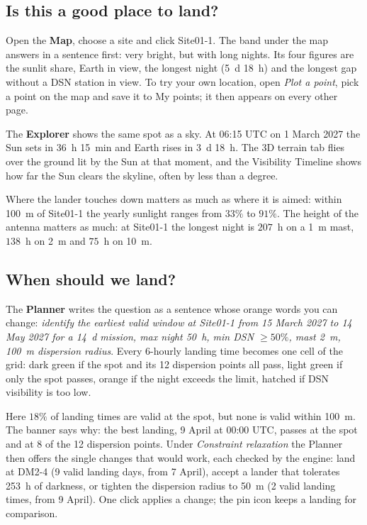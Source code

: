 \subsection{Is this a good place to land?}
Open the \textbf{Map}, choose a site and click Site01-1. The band under the map answers in a sentence first: very bright, but with long nights. Its four figures are the sunlit share, Earth in view, the longest night (5~d 18~h) and the longest gap without a DSN station in view. To try your own location, open \emph{Plot a point}, pick a point on the map and save it to My points; it then appears on every other page.

The \textbf{Explorer} shows the same spot as a sky. At 06:15 UTC on 1 March 2027 the Sun sets in 36~h 15~min and Earth rises in 3~d 18~h. The 3D terrain tab flies over the ground lit by the Sun at that moment, and the Visibility Timeline shows how far the Sun clears the skyline, often by less than a degree.


Where the lander touches down matters as much as where it is aimed: within 100~m of Site01-1 the yearly sunlight ranges from $33\%$ to $91\%$. The height of the antenna matters as much: at Site01-1 the longest night is $207$~h on a 1~m mast, $138$~h on 2~m and $75$~h on 10~m.

\subsection{When should we land?}
The \textbf{Planner} writes the question as a sentence whose orange words you can change: \emph{identify the earliest valid window at Site01-1 from 15 March 2027 to 14 May 2027 for a 14~d mission, max night 50~h, min DSN $\ge 50\%$, mast 2~m, 100~m dispersion radius}. Every 6-hourly landing time becomes one cell of the grid: dark green if the spot and its 12 dispersion points all pass, light green if only the spot passes, orange if the night exceeds the limit, hatched if DSN visibility is too low.

Here $18\%$ of landing times are valid at the spot, but none is valid within 100~m. The banner says why: the best landing, 9 April at 00:00 UTC, passes at the spot and at 8 of the 12 dispersion points. Under \emph{Constraint relaxation} the Planner then offers the single changes that would work, each checked by the engine: land at DM2-4 (9 valid landing days, from 7 April), accept a lander that tolerates 253~h of darkness, or tighten the dispersion radius to 50~m (2 valid landing times, from 9 April). One click applies a change; the pin icon keeps a landing for comparison.

